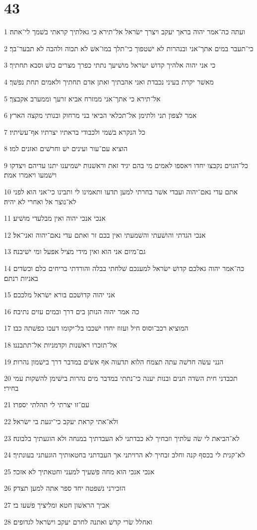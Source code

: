 \chapter{43}

\par 1 ועתה כה־אמר יהוה בראך יעקב ויצרך ישׂראל אל־תירא כי גאלתיך קראתי בשׁמך לי־אתה׃
\par 2 כי־תעבר במים אתך־אני ובנהרות לא ישׁטפוך כי־תלך במו־אשׁ לא תכוה ולהבה לא תבער־בך׃
\par 3 כי אני יהוה אלהיך קדושׁ ישׂראל מושׁיעך נתתי כפרך מצרים כושׁ וסבא תחתיך׃
\par 4 מאשׁר יקרת בעיני נכבדת ואני אהבתיך ואתן אדם תחתיך ולאמים תחת נפשׁך׃
\par 5 אל־תירא כי אתך־אני ממזרח אביא זרעך וממערב אקבצך׃
\par 6 אמר לצפון תני ולתימן אל־תכלאי הביאי בני מרחוק ובנותי מקצה הארץ׃
\par 7 כל הנקרא בשׁמי ולכבודי בראתיו יצרתיו אף־עשׂיתיו׃
\par 8 הוציא עם־עור ועינים ישׁ וחרשׁים ואזנים למו׃
\par 9 כל־הגוים נקבצו יחדו ויאספו לאמים מי בהם יגיד זאת וראשׁנות ישׁמיענו יתנו עדיהם ויצדקו וישׁמעו ויאמרו אמת׃
\par 10 אתם עדי נאם־יהוה ועבדי אשׁר בחרתי למען תדעו ותאמינו לי ותבינו כי־אני הוא לפני לא־נוצר אל ואחרי לא יהיה׃
\par 11 אנכי אנכי יהוה ואין מבלעדי מושׁיע׃
\par 12 אנכי הגדתי והושׁעתי והשׁמעתי ואין בכם זר ואתם עדי נאם־יהוה ואני־אל׃
\par 13 גם־מיום אני הוא ואין מידי מציל אפעל ומי ישׁיבנה׃
\par 14 כה־אמר יהוה גאלכם קדושׁ ישׂראל למענכם שׁלחתי בבלה והורדתי בריחים כלם וכשׂדים באניות רנתם׃
\par 15 אני יהוה קדושׁכם בורא ישׂראל מלככם׃
\par 16 כה אמר יהוה הנותן בים דרך ובמים עזים נתיבה׃
\par 17 המוציא רכב־וסוס חיל ועזוז יחדו ישׁכבו בל־יקומו דעכו כפשׁתה כבו׃
\par 18 אל־תזכרו ראשׁנות וקדמניות אל־תתבננו׃
\par 19 הנני עשׂה חדשׁה עתה תצמח הלוא תדעוה אף אשׂים במדבר דרך בישׁמון נהרות׃
\par 20 תכבדני חית השׂדה תנים ובנות יענה כי־נתתי במדבר מים נהרות בישׁימן להשׁקות עמי בחירי׃
\par 21 עם־זו יצרתי לי תהלתי יספרו׃
\par 22 ולא־אתי קראת יעקב כי־יגעת בי ישׂראל׃
\par 23 לא־הביאת לי שׂה עלתיך וזבחיך לא כבדתני לא העבדתיך במנחה ולא הוגעתיך בלבונה׃
\par 24 לא־קנית לי בכסף קנה וחלב זבחיך לא הרויתני אך העבדתני בחטאותיך הוגעתני בעונתיך׃
\par 25 אנכי אנכי הוא מחה פשׁעיך למעני וחטאתיך לא אזכר׃
\par 26 הזכירני נשׁפטה יחד ספר אתה למען תצדק׃
\par 27 אביך הראשׁון חטא ומליציך פשׁעו בי׃
\par 28 ואחלל שׂרי קדשׁ ואתנה לחרם יעקב וישׂראל לגדופים׃

